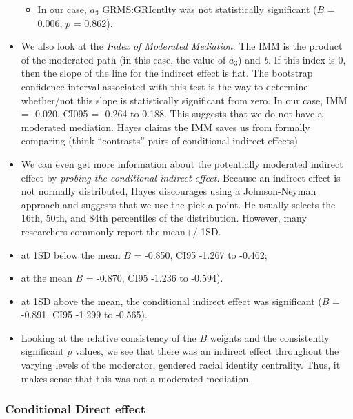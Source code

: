 \documentclass[
]{book}
\providecommand{\tightlist}{%
  \setlength{\itemsep}{0pt}\setlength{\parskip}{0pt}}
\begin{document}
\begin{itemize}
  \begin{itemize}
  \tightlist
  \item
    In our case, \(a_{3}\) GRMS:GRIcntlty was not statistically significant (\(B\) = 0.006, \(p\) = 0.862).
  \end{itemize}
\item
  We also look at the \emph{Index of Moderated Mediation}. The IMM is the product of the moderated path (in this case, the value of \(a_{3}\)) and \emph{b}. If this index is 0, then the slope of the line for the indirect effect is flat. The bootstrap confidence interval associated with this test is the way to determine whether/not this slope is statistically significant from zero. In our case, IMM = -0.020, CI095 = -0.264 to 0.188. This suggests that we do not have a moderated mediation. Hayes claims the IMM saves us from formally comparing (think ``contrasts'' pairs of conditional indirect effects)
\item
  We can even get more information about the potentially moderated indirect effect by \emph{probing the conditional indirect effect}. Because an indirect effect is not normally distributed, Hayes discourages using a Johnson-Neyman approach and suggests that we use the pick-a-point. He usually selects the 16th, 50th, and 84th percentiles of the distribution. However, many researchers commonly report the mean+/-1SD.
\item
  at 1SD below the mean \(B\) = -0.850, CI95 -1.267 to -0.462;
\item
  at the mean \(B\) = -0.870, CI95 -1.236 to -0.594).\\
\item
  at 1SD above the mean, the conditional indirect effect was significant (\(B\) = -0.891, CI95 -1.299 to -0.565).\\
\item
  Looking at the relative consistency of the \(B\) weights and the consistently significant \(p\) values, we see that there was an indirect effect throughout the varying levels of the moderator, gendered racial identity centrality. Thus, it makes sense that this was not a moderated mediation.
\end{itemize}

\hypertarget{conditional-direct-effect}{%
\subsubsection{Conditional Direct effect}\label{conditional-direct-effect}}
\end{document}
